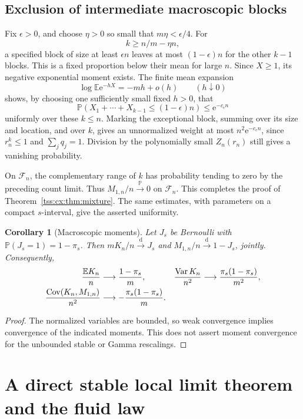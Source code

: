 \documentclass[11pt]{article}
\newtheorem{corollary}[theorem]{Corollary}
\theoremstyle{remark}\newtheorem{remark}[theorem]{Remark}
\theoremstyle{definition}\newtheorem{definition}[theorem]{Definition}
\newcommand{\e}{\mathrm e}
\DeclareMathOperator{\Var}{Var}
\newcommand{\E}{\mathbb E}
\newcommand{\Prob}{\mathbb P}
\newcommand{\dto}{\xrightarrow{\mathrm d}}
\newcommand{\pto}{\xrightarrow{\Prob}}
\newcommand{\Fev}{\mathcal F_n}
\DeclareMathOperator{\Cov}{Cov}
\begin{document}
\subsection{Exclusion of intermediate macroscopic blocks}
Fix $\epsilon>0$, and choose $\eta>0$ so small that
$m\eta<\epsilon/4$. For
\[
 k\ge n/m-\eta n,
\]
a specified block of size at least $\epsilon n$ leaves at most
$(1-\epsilon)n$ for the other $k-1$ blocks. This is a fixed
proportion below their mean for large $n$.
Since $X\ge1$, its negative exponential moment exists. The finite
mean expansion
\[
 \log\E\e^{-hX}=-mh+o(h)\qquad(h\downarrow0)
\]
shows, by choosing one sufficiently small fixed $h>0$, that
\begin{equation}\label{tss:cx:eq:Chernoff}
 \Prob(X_1+\cdots+X_{k-1}\le(1-\epsilon)n)\le\e^{-c_\epsilon n}
\end{equation}
uniformly over these $k\le n$. Marking the exceptional block,
summing over its size and location, and over $k$, gives an
unnormalized weight at most $n^2\e^{-c_\epsilon n}$, since $r_n^k\le1$
and $\sum_jq_j=1$. Division by the polynomially small $Z_n(r_n)$
still gives a vanishing probability.

On $\Fev$, the complementary range of $k$ has probability tending
to zero by the preceding count limit. Thus
$M_{1,n}/n\pto0$ on $\Fev$. This completes the proof of
Theorem~\ref{tss:cx:thm:mixture}. The same estimates, with parameters on a
compact $s$-interval, give the asserted uniformity.

\begin{corollary}[Macroscopic moments]\label{tss:cx:cor:moments}
Let $J_s$ be Bernoulli with $\Prob(J_s=1)=1-\pi_s$. Then
$mK_n/n\dto J_s$ and $M_{1,n}/n\dto1-J_s$, jointly. Consequently,
\begin{align}
 \frac{\E K_n}{n}&\longrightarrow\frac{1-\pi_s}{m},&
 \frac{\Var K_n}{n^2}&\longrightarrow\frac{\pi_s(1-\pi_s)}{m^2},
 \label{tss:cx:eq:moments}\\
 \frac{\Cov(K_n,M_{1,n})}{n^2}
 &\longrightarrow-\frac{\pi_s(1-\pi_s)}m.&\notag
\end{align}
\end{corollary}
\begin{proof}
The normalized variables are bounded, so weak convergence implies
convergence of the indicated moments. This does not assert moment
convergence for the unbounded stable or Gamma rescalings.
\end{proof}

\section{A direct stable local limit theorem and the fluid law}
\label{tss:cx:sec:stable}
\end{document}

